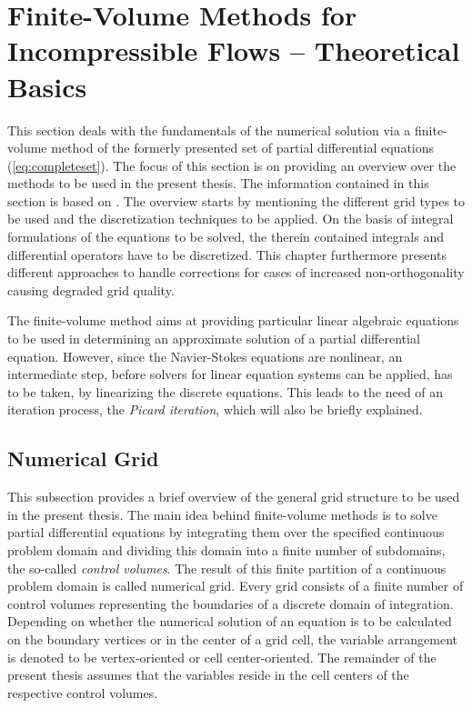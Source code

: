 \section{Finite-Volume Methods for Incompressible Flows -- Theoretical Basics}
\label{sec:fvm}

This section deals with the fundamentals of the numerical solution via a finite-volume method of the formerly presented set of partial differential equations (\ref{eq:completeset}). The focus of this section is on providing an overview over the methods to be used in the present thesis. The information contained in this section is based on \cite{ferziger02,jasak96,schaefer99,muzaferja}. The overview starts by mentioning the different grid types to be used and the discretization techniques to be applied. On the basis of integral formulations of the equations to be solved, the therein contained integrals and differential operators have to be discretized. This chapter furthermore presents different approaches to handle corrections for cases of increased non-orthogonality causing degraded grid quality.
  
The finite-volume method aims at providing particular linear algebraic equations to be used in determining an approximate solution of a partial differential equation. However, since the Navier-Stokes equations are nonlinear, an intermediate step, before solvers for linear equation systems can be applied, has to be taken, by linearizing the discrete equations. This leads to the need of an iteration process, the \emph{Picard iteration}, which will also be briefly explained. 
      
\subsection{Numerical Grid}

This subsection provides a brief overview of the general grid structure to be used in the present thesis. The main idea behind finite-volume methods is to solve partial differential equations by integrating them over the specified continuous problem domain and dividing this domain into a finite number of subdomains, the so-called \emph{control volumes}. The result of this finite partition of a continuous problem domain is called numerical grid. Every grid consists of a finite number of control volumes representing the boundaries of a discrete domain of integration. Depending on whether the numerical solution of an equation is to be calculated on the boundary vertices or in the center of a grid cell, the variable arrangement is denoted to be vertex-oriented or cell center-oriented. The remainder of the present thesis assumes that the variables reside in the cell centers of the respective control volumes.

